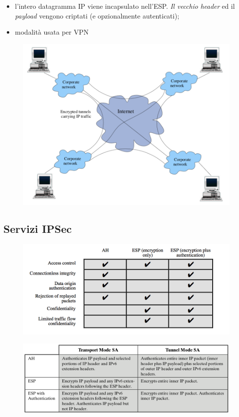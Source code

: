 \documentclass[11pt, a4paper, twoside, italian]{report}
\theoremstyle{plain}
\begin{document}
\begin{multicols}{2}
\begin{itemize}
\begin{figure}[H]
		\end{figure}
		\begin{itemize}
			\item l'intero datagramma IP viene incapsulato nell'ESP. \textit{Il vecchio header} ed il \textit{payload} vengono criptati (e opzionalmente autenticati);
			\item modalità usata per VPN
		\end{itemize}
	\begin{figure}[H]
		\centering
		\includegraphics[scale=0.33]{tunn}
	\end{figure}
\end{itemize}
\end{multicols}


\subsection*{Servizi IPSec}
\begin{figure}[H]
	\centering
	\includegraphics[scale=0.7]{recapipsec}
\end{figure}
\begin{figure}[H]
	\centering
	\includegraphics[scale=0.65]{recapipsec2}
\end{figure}
\end{document}
